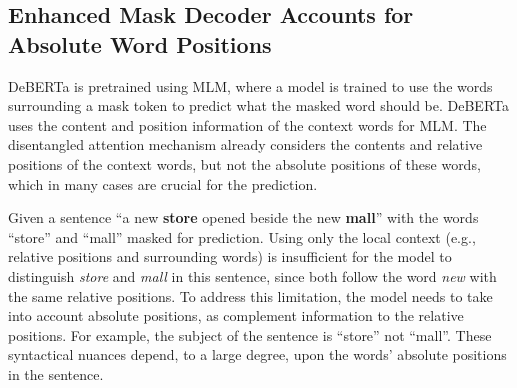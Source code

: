 \subsection{Enhanced Mask Decoder Accounts for Absolute Word Positions}
\label{EMD}

DeBERTa is pretrained using MLM, where a model is trained to use the words surrounding a mask token to predict what the masked word should be. 
DeBERTa uses the content and position information of the context words for MLM. The disentangled attention mechanism already considers the contents and relative positions of the context words, but not the absolute positions of these words, which in many cases are crucial for the prediction.

Given a sentence ``a new \textbf{store} opened beside the new \textbf{mall}'' with the words ``store'' and ``mall'' masked for prediction. Using only the local context (e.g., relative positions and surrounding words) is insufficient for the model to distinguish \textit{store} and \textit{mall} in this sentence, since both follow the word \textit{new} with the same relative positions. 
To address this limitation, the model needs to take into account absolute positions, as complement information to the relative positions. 
For example, the subject of the sentence is “store” not “mall”. These syntactical nuances depend, to a large degree, upon the words’ absolute positions in the sentence.

